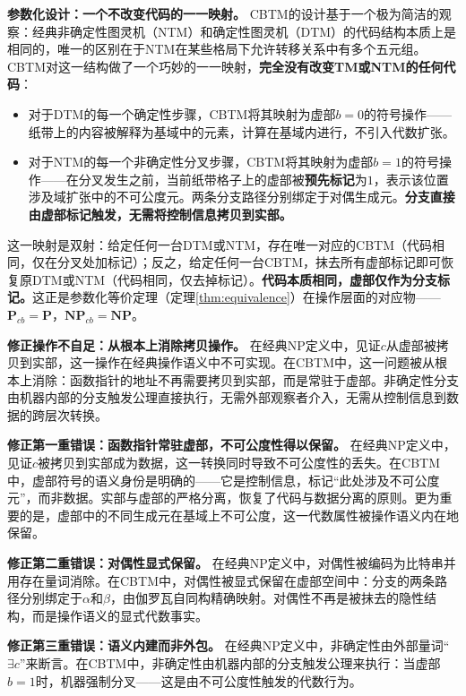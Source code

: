 \documentclass{ctexart}
\begin{document}
	\textbf{参数化设计：一个不改变代码的一一映射。} CBTM的设计基于一个极为简洁的观察：经典非确定性图灵机（NTM）和确定性图灵机（DTM）的代码结构本质上是相同的，唯一的区别在于NTM在某些格局下允许转移关系中有多个五元组。CBTM对这一结构做了一个巧妙的一一映射，\textbf{完全没有改变TM或NTM的任何代码}：
	\begin{itemize}
		\item 对于DTM的每一个确定性步骤，CBTM将其映射为虚部$b=0$的符号操作——纸带上的内容被解释为基域中的元素，计算在基域内进行，不引入代数扩张。
		\item 对于NTM的每一个非确定性分叉步骤，CBTM将其映射为虚部$b=1$的符号操作——在分叉发生之前，当前纸带格子上的虚部被\textbf{预先标记}为$1$，表示该位置涉及域扩张中的不可公度元。两条分支路径分别绑定于对偶生成元。\textbf{分支直接由虚部标记触发，无需将控制信息拷贝到实部。}
	\end{itemize}
	
	这一映射是双射：给定任何一台DTM或NTM，存在唯一对应的CBTM（代码相同，仅在分叉处加标记）；反之，给定任何一台CBTM，抹去所有虚部标记即可恢复原DTM或NTM（代码相同，仅去掉标记）。\textbf{代码本质相同，虚部仅作为分支标记。}这正是参数化等价定理（定理\ref{thm:equivalence}）在操作层面的对应物——$\mathbf{P}_{cb} = \mathbf{P}$，$\mathbf{NP}_{cb} = \mathbf{NP}$。
	
	\textbf{修正操作不自足：从根本上消除拷贝操作。} 在经典NP定义中，见证$c$从虚部被拷贝到实部，这一操作在经典操作语义中不可实现。在CBTM中，这一问题被从根本上消除：函数指针的地址不再需要拷贝到实部，而是常驻于虚部。非确定性分支由机器内部的分支触发公理直接执行，无需外部观察者介入，无需从控制信息到数据的跨层次转换。
	
	\textbf{修正第一重错误：函数指针常驻虚部，不可公度性得以保留。} 在经典NP定义中，见证$c$被拷贝到实部成为数据，这一转换同时导致不可公度性的丢失。在CBTM中，虚部符号的语义身份是明确的——它是控制信息，标记``此处涉及不可公度元''，而非数据。实部与虚部的严格分离，恢复了代码与数据分离的原则。更为重要的是，虚部中的不同生成元在基域上不可公度，这一代数属性被操作语义内在地保留。
	
	\textbf{修正第二重错误：对偶性显式保留。} 在经典NP定义中，对偶性被编码为比特串并用存在量词消除。在CBTM中，对偶性被显式保留在虚部空间中：分支的两条路径分别绑定于$\alpha$和$\beta$，由伽罗瓦自同构精确映射。对偶性不再是被抹去的隐性结构，而是操作语义的显式代数事实。
	
	\textbf{修正第三重错误：语义内建而非外包。} 在经典NP定义中，非确定性由外部量词``$\exists c$''来断言。在CBTM中，非确定性由机器内部的分支触发公理来执行：当虚部$b=1$时，机器强制分叉——这是由不可公度性触发的代数行为。
	
\end{document}
